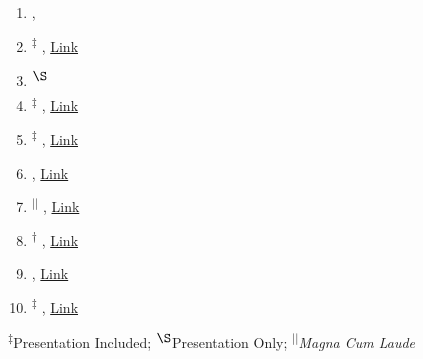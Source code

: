 \normalsize
\begin{center}
\begin{minipage}{0.95\textwidth}
	\begin{enumerate}[leftmargin=5mm,itemsep=2mm]
	\item {}, \label{ieee_nss_paper}
	\item \textsuperscript{$\ddagger$}  , 
		\href{https://laws.lanl.gov/vhosts/mcnp.lanl.gov/pdf_files/la-ur-17-20353.pdf}{Link}   \label{ans_summer2017_paper}
	\item \textsuperscript{$\S$}  \label{ans_summer2017_jrt_paper}
	\item \textsuperscript{$\ddagger$}  , 
		\href{https://app.box.com/s/kbe3jlwsq0qxcyrirneqpodl3mqoz3n3}{Link}\label{caari_2016_paper_1}
	\item \textsuperscript{$\ddagger$}  , 
		\href{https://app.box.com/s/sqx0ddl77lg0vue0ahffhdr9pclmlybi}{Link}\label{caari_2016_paper_2}
	\item  {}, 
		\href{https://app.box.com/s/raujd5ok40d45qaeq3lx2r6akdv8xfqx}{Link}\label{ans_winter2016_paper}
	\item \textsuperscript{$||$}   , 
		\href{http://cds.ismrm.org/protected/16MPresentations/abstracts/1108.html}{Link}\label{ismrm_2016_paper}
	\item \textsuperscript{$\dagger$} , 
		\href{https://app.box.com/s/yc0aft4oafsgg6f6qhzjpvbgouql0lle}{Link}\label{cmrr_2015_paper}
        \item {}, 
		\href{https://app.box.com/s/bj7sbfqana8sixv70nu6afa5i5mfuamt}{Link}\label{ismrm_2014_paper}
	\item \textsuperscript{$\ddagger$}  , 
		\href{https://app.box.com/s/rqnshtxi4umq1lm2m5g7fcd16m1ztap0}{Link}\label{abaqus_2012_paper}
   \end{enumerate}
\end{minipage}
\end{center}

\footnotesize
\begin{center}
\textsuperscript{$\ddagger$}Presentation Included; \textsuperscript{$\S$}Presentation Only; \textsuperscript{$||$}\textit{Magna Cum Laude}
\end{center}
